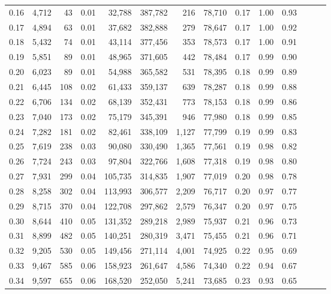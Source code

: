 \begin{tabular}{rrrrrrrrrrrrrr}
0.16 &  4,712 &     43 &  0.01 &   32,788 &  387,782 &     216 &  78,710 &  0.17 &  1.00 &      0.93 \\
0.17 &  4,894 &     63 &  0.01 &   37,682 &  382,888 &     279 &  78,647 &  0.17 &  1.00 &      0.92 \\
0.18 &  5,432 &     74 &  0.01 &   43,114 &  377,456 &     353 &  78,573 &  0.17 &  1.00 &      0.91 \\
0.19 &  5,851 &     89 &  0.01 &   48,965 &  371,605 &     442 &  78,484 &  0.17 &  0.99 &      0.90 \\
0.20 &  6,023 &     89 &  0.01 &   54,988 &  365,582 &     531 &  78,395 &  0.18 &  0.99 &      0.89 \\
0.21 &  6,445 &    108 &  0.02 &   61,433 &  359,137 &     639 &  78,287 &  0.18 &  0.99 &      0.88 \\
0.22 &  6,706 &    134 &  0.02 &   68,139 &  352,431 &     773 &  78,153 &  0.18 &  0.99 &      0.86 \\
0.23 &  7,040 &    173 &  0.02 &   75,179 &  345,391 &     946 &  77,980 &  0.18 &  0.99 &      0.85 \\
0.24 &  7,282 &    181 &  0.02 &   82,461 &  338,109 &   1,127 &  77,799 &  0.19 &  0.99 &      0.83 \\
0.25 &  7,619 &    238 &  0.03 &   90,080 &  330,490 &   1,365 &  77,561 &  0.19 &  0.98 &      0.82 \\
0.26 &  7,724 &    243 &  0.03 &   97,804 &  322,766 &   1,608 &  77,318 &  0.19 &  0.98 &      0.80 \\
0.27 &  7,931 &    299 &  0.04 &  105,735 &  314,835 &   1,907 &  77,019 &  0.20 &  0.98 &      0.78 \\
0.28 &  8,258 &    302 &  0.04 &  113,993 &  306,577 &   2,209 &  76,717 &  0.20 &  0.97 &      0.77 \\
0.29 &  8,715 &    370 &  0.04 &  122,708 &  297,862 &   2,579 &  76,347 &  0.20 &  0.97 &      0.75 \\
0.30 &  8,644 &    410 &  0.05 &  131,352 &  289,218 &   2,989 &  75,937 &  0.21 &  0.96 &      0.73 \\
0.31 &  8,899 &    482 &  0.05 &  140,251 &  280,319 &   3,471 &  75,455 &  0.21 &  0.96 &      0.71 \\
0.32 &  9,205 &    530 &  0.05 &  149,456 &  271,114 &   4,001 &  74,925 &  0.22 &  0.95 &      0.69 \\
0.33 &  9,467 &    585 &  0.06 &  158,923 &  261,647 &   4,586 &  74,340 &  0.22 &  0.94 &      0.67 \\
0.34 &  9,597 &    655 &  0.06 &  168,520 &  252,050 &   5,241 &  73,685 &  0.23 &  0.93 &      0.65 \\

\end{tabular}
